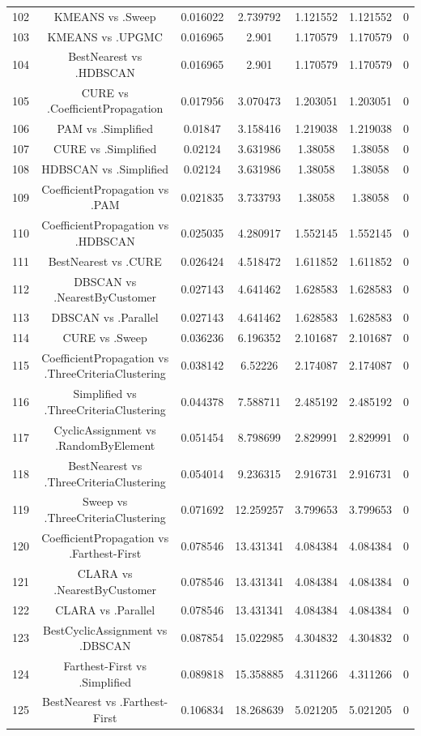 \documentclass[a4paper,10pt]{article}
\begin{document}
\begin{landscape}
\begin{table}[!htp]
\begin{tabular}{ccccccc}
102&KMEANS vs .Sweep&0.016022&2.739792&1.121552&1.121552&0\\
103&KMEANS vs .UPGMC&0.016965&2.901&1.170579&1.170579&0\\
104&BestNearest vs .HDBSCAN&0.016965&2.901&1.170579&1.170579&0\\
105&CURE vs .CoefficientPropagation&0.017956&3.070473&1.203051&1.203051&0\\
106&PAM vs .Simplified&0.01847&3.158416&1.219038&1.219038&0\\
107&CURE vs .Simplified&0.02124&3.631986&1.38058&1.38058&0\\
108&HDBSCAN vs .Simplified&0.02124&3.631986&1.38058&1.38058&0\\
109&CoefficientPropagation vs .PAM&0.021835&3.733793&1.38058&1.38058&0\\
110&CoefficientPropagation vs .HDBSCAN&0.025035&4.280917&1.552145&1.552145&0\\
111&BestNearest vs .CURE&0.026424&4.518472&1.611852&1.611852&0\\
112&DBSCAN vs .NearestByCustomer&0.027143&4.641462&1.628583&1.628583&0\\
113&DBSCAN vs .Parallel&0.027143&4.641462&1.628583&1.628583&0\\
114&CURE vs .Sweep&0.036236&6.196352&2.101687&2.101687&0\\
115&CoefficientPropagation vs .ThreeCriteriaClustering&0.038142&6.52226&2.174087&2.174087&0\\
116&Simplified vs .ThreeCriteriaClustering&0.044378&7.588711&2.485192&2.485192&0\\
117&CyclicAssignment vs .RandomByElement&0.051454&8.798699&2.829991&2.829991&0\\
118&BestNearest vs .ThreeCriteriaClustering&0.054014&9.236315&2.916731&2.916731&0\\
119&Sweep vs .ThreeCriteriaClustering&0.071692&12.259257&3.799653&3.799653&0\\
120&CoefficientPropagation vs .Farthest-First&0.078546&13.431341&4.084384&4.084384&0\\
121&CLARA vs .NearestByCustomer&0.078546&13.431341&4.084384&4.084384&0\\
122&CLARA vs .Parallel&0.078546&13.431341&4.084384&4.084384&0\\
123&BestCyclicAssignment vs .DBSCAN&0.087854&15.022985&4.304832&4.304832&0\\
124&Farthest-First vs .Simplified&0.089818&15.358885&4.311266&4.311266&0\\
125&BestNearest vs .Farthest-First&0.106834&18.268639&5.021205&5.021205&0\\

\end{tabular}
\end{table}
\end{landscape}
\end{document}
